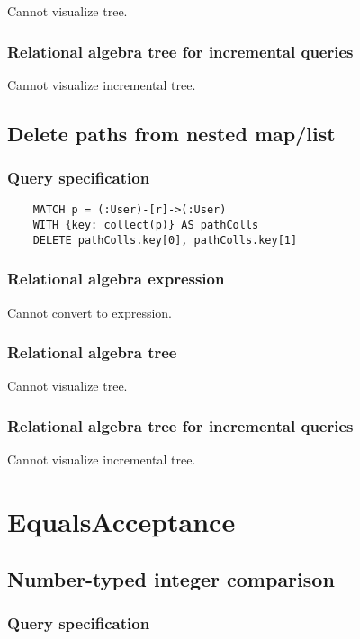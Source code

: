 	Cannot visualize tree.

	\subsubsection*{Relational algebra tree for incremental queries}

	Cannot visualize incremental tree.
	\subsection{Delete paths from nested map/list}

	\subsubsection*{Query specification}

	\begin{lstlisting}
	MATCH p = (:User)-[r]->(:User)
	WITH {key: collect(p)} AS pathColls
	DELETE pathColls.key[0], pathColls.key[1]
	\end{lstlisting}


	\subsubsection*{Relational algebra expression}

	Cannot convert to expression.

	\subsubsection*{Relational algebra tree}

	Cannot visualize tree.

	\subsubsection*{Relational algebra tree for incremental queries}

	Cannot visualize incremental tree.

	\section{EqualsAcceptance}

	\subsection{Number-typed integer comparison}

	\subsubsection*{Query specification}

